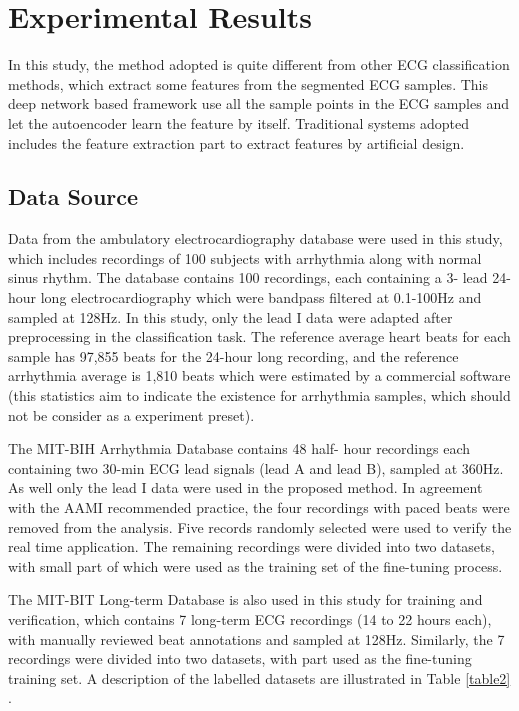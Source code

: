\documentclass{bmcart}
\begin{document}
\section*{Experimental Results}

In this study, the method adopted is quite different from other ECG classification methods, which extract some features from the segmented ECG samples. This deep network based framework use all the sample points in the ECG samples and let the autoencoder learn the feature by itself.  Traditional systems adopted includes the feature extraction part to extract features by artificial design.

\subsection*{Data Source}
Data from the ambulatory electrocardiography database were used in this study, which includes recordings of 100 subjects with arrhythmia along with normal sinus rhythm. The database contains 100 recordings, each containing a 3- lead 24-hour long electrocardiography which were bandpass filtered at 0.1-100Hz and sampled at 128Hz. In this study, only the lead I data were adapted after preprocessing in the classification task. The reference average heart beats for each sample has 97,855 beats for the 24-hour long recording, and the reference arrhythmia average is 1,810 beats which were estimated by a commercial software (this statistics aim to indicate the existence for arrhythmia samples, which should not be consider as a experiment preset).

The MIT-BIH Arrhythmia Database \cite{physionet} contains 48 half- hour recordings each containing two 30-min ECG lead signals (lead A and lead B), sampled at 360Hz. As well only the lead I data were used in the proposed method. In agreement with the AAMI recommended practice, the four recordings with paced beats were removed from the analysis. Five records randomly selected were used to verify the real time application. The remaining recordings were divided into two datasets, with small part of which were used as the training set of the fine-tuning process.

The MIT-BIT Long-term Database is also used in this study for training and verification, which contains 7 long-term ECG recordings (14 to 22 hours each), with manually reviewed beat annotations and sampled at 128Hz. Similarly, the 7 recordings were divided into two datasets, with part used as the fine-tuning training set. A description of the labelled datasets are illustrated in Table  \ref{table2} .
\end{document}
